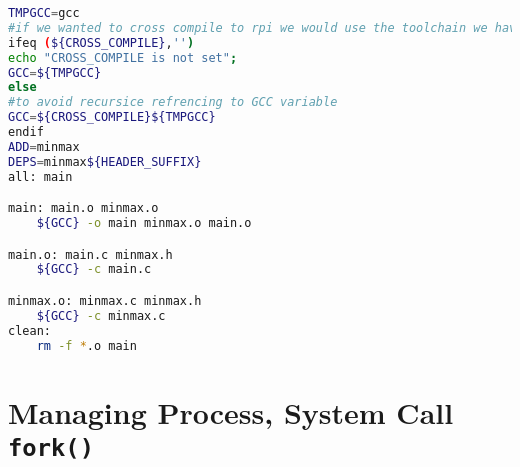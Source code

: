 \documentclass[a4paper,oneside,onecolumn]{article}
\newcommand{\code}[1]{\colorbox{codegray}{\texttt{#1}}}
\begin{document}
\begin{lstlisting}[language=bash,caption={bash version}]
TMPGCC=gcc
#if we wanted to cross compile to rpi we would use the toolchain we have downloaded for the kernel compilation : arm-linux-gnueabi-gcc, but to use it we would have to specify a path. In our case we have exported the path to the folder in the vaiable CROSS_COMPILE
ifeq (${CROSS_COMPILE},'')
echo "CROSS_COMPILE is not set";
GCC=${TMPGCC}
else
#to avoid recursice refrencing to GCC variable
GCC=${CROSS_COMPILE}${TMPGCC}
endif
ADD=minmax
DEPS=minmax${HEADER_SUFFIX}
all: main

main: main.o minmax.o
	${GCC} -o main minmax.o main.o

main.o: main.c minmax.h
	${GCC} -c main.c

minmax.o: minmax.c minmax.h
	${GCC} -c minmax.c
clean:
	rm -f *.o main

\end{lstlisting}


\noindent
\section*{Managing Process, System Call \code{fork()}}
\end{document}

